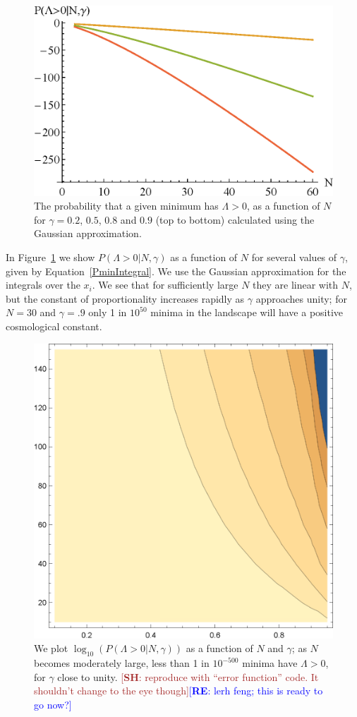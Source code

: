 \documentclass[12pt]{article}
\newcommand{\re}[1]{\textcolor{blue}{[{\bf RE}: #1]}}
\newcommand{\SH}[1]{\textcolor{brown}{[{\bf SH}: #1]}}
\begin{document}
\begin{figure} 
  \centering
  \includegraphics[width=.6 \linewidth]{Fig6.eps}
  \caption{The probability that a given minimum has $\Lambda>0$, as a function of $N$ for $\gamma=0.2$, $0.5$, $0.8$ and $0.9$ (top to bottom) calculated using the Gaussian approximation.}
  \label{PVaryingWithNGaussian}
\end{figure}
  
In  Figure~\ref{PVaryingWithNGaussian} we show $P(\Lambda>0|N,\gamma)$ as a function of $N$ for several values of $\gamma$, given by Equation~\ref{PminIntegral}. We use the Gaussian approximation for the integrals over the $x_i$. We see that for sufficiently large $N$ they are linear with $N$, but the constant of proportionality increases rapidly as $\gamma$ approaches unity; for $N=30$ and $\gamma = .9$ only 1 in $10^{50}$ minima in the landscape will have a positive cosmological constant.


\begin{figure} 
  \centering
  \includegraphics[width=.6 \linewidth]{histo.eps}
  \caption{We plot $\log_{10}(P(\Lambda>0|N,\gamma))$ as a function of $N$ and $\gamma$; as $N$ becomes moderately large, less than 1 in $10^{-500}$ minima have $\Lambda>0$, for $\gamma$  close to unity.  \SH{reproduce with ``error function'' code. It shouldn't change to the eye though}\re{lerh feng; this is ready to go now?}}
  \label{fullcontourplot}
\end{figure}
\end{document}
